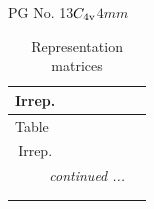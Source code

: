 \documentclass[fleqn,8pt,landscape]{jsarticle}
\begin{document}
\setcounter{MaxMatrixCols}{32}

\renewcommand{\tablename}{Table~}
\renewcommand{\figurename}{Figure~}
\begin{center}
\LARGE
PG No. 13\quad$C_{\rm 4v}$\quad$4mm$\quad[ tetragonal ]
\end{center}
\renewcommand{\arraystretch}{1.2}
\begin{longtable}{ccccccc}
\caption{Representation matrices}
 \\
 \hline \hline
Irrep. &  &  &  &  &  &  \\ \hline \endfirsthead

\multicolumn{6}{l}{\tablename\ \thetable{}} \\
 \hline \hline
Irrep. &  &  &  &  &  &  \\ \hline \endhead

 \hline \hline
\multicolumn{6}{r}{\footnotesize\it continued ...} \\ \endfoot

 \hline \hline
\multicolumn{6}{r}{} \\ \endlastfoot


\end{longtable}
\end{document}
